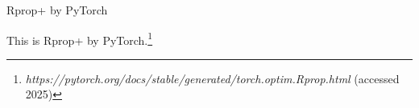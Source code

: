 \begin{subsection}{Rprop+ by PyTorch}
    \par This is Rprop+ by PyTorch.\footnote{\textit{https://pytorch.org/docs/stable/generated/torch.optim.Rprop.html} (accessed 2025)}
\end{subsection}